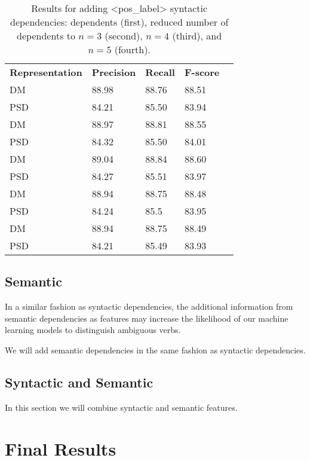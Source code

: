 \begin{table}
    \centering
    \smaller[0.2]
    \begin{tabular}{@{}lllll@{}}
        \toprule
        \textbf{Representation} & \textbf{Precision} & \textbf{Recall} & \textbf{F-score} \\
        DM &  88.98 & 88.76 & 88.51 \\
        PSD & 84.21 & 85.50 & 83.94 \\
        \midrule
        DM &  88.97 & 88.81 & 88.55 \\
        PSD & 84.32 & 85.50 & 84.01 \\
        \midrule
        DM &  89.04 & 88.84 & 88.60 \\
        PSD & 84.27 & 85.51 & 83.97 \\
        \midrule
        DM &  88.94 & 88.75 & 88.48 \\
        PSD & 84.24 & 85.5 & 83.95 \\
        \midrule
        DM &  88.94 & 88.75 & 88.49 \\
        PSD & 84.21 & 85.49 & 83.93 \\
        \bottomrule
    \end{tabular}
    \caption{Results for adding <pos\_label> syntactic dependencies: dependents (first), reduced number of dependents to $n=3$ (second), $n=4$ (third), and $n=5$ (fourth).}
    \label{table:dependents_head}
\end{table}

\subsection{Semantic}
\label{results_sem}

In a similar fashion as syntactic dependencies, the additional information from semantic dependencies as features may increase the likelihood of our machine learning models to distinguish ambiguous verbs. 

We will add semantic dependencies in the same fashion as syntactic dependencies.


\subsection{Syntactic and Semantic}
\label{results_syn_sem}

In this section we will combine syntactic and semantic features.


\section{Final Results}
\label{results_final}

